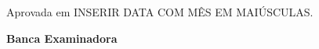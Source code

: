 
%
% 
%
\begin{folhadeaprovacao}

  \begin{center}
      \MakeUppercase{\ABNTEXchapterfont\bfseries\large\imprimirautor}
    \vspace{1cm}
    
    \MakeUppercase{\ABNTEXchapterfont\Large\imprimirtitulo}
  \end{center}

    \vspace{1cm}  
    \vspace*{\fill}
    \imprimirpreambulo
    \vspace*{\fill}
            
   \begin{flushright}
     Aprovada em INSERIR DATA COM MÊS EM MAIÚSCULAS.
   \end{flushright}
    \vspace{1cm}
   \center\bfseries{Banca Examinadora}

      
    \vspace*{2cm}
\end{folhadeaprovacao}
